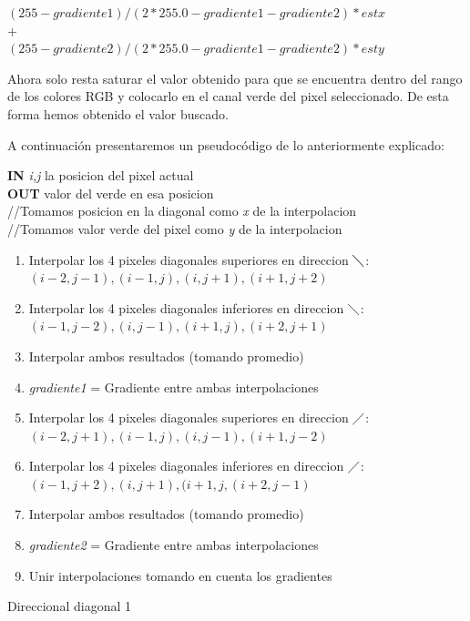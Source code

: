 \documentclass[10pt, a4paper]{article}
\begin{document}
\begin{center}
$(255-gradiente1)/(2*255.0-gradiente1-gradiente2)*estx$\\$+$\\$(255-gradiente2)/(2*255.0-gradiente1-gradiente2)*esty$
\end{center}

Ahora solo resta saturar el valor obtenido para que se encuentra dentro del rango de los colores RGB y colocarlo en el canal verde del pixel seleccionado. De esta forma hemos obtenido el valor buscado. 

A continuaci\'on presentaremos un pseudoc\'odigo de lo anteriormente explicado:

\vspace{0.5cm}
\begin{algorithm}[H]
\textbf{IN} \textit{i,j} la posicion del pixel actual \\
\textbf{OUT} valor del verde en esa posicion\\
//Tomamos posicion en la diagonal como \textit{x} de la interpolacion\\
//Tomamos valor verde del pixel como \textit{y} de la interpolacion\\
\begin{enumerate}[label=\bfseries Step \arabic*:]
\item Interpolar los 4 pixeles diagonales superiores en direccion $\diagdown$: $(i-2,j-1),(i-1,j),(i,j+1),(i+1,j+2)$\\
\item Interpolar los 4 pixeles diagonales inferiores en direccion $\diagdown$: $(i-1, j-2),(i, j-1),(i+1, j),(i+2, j+1)$\\
\item Interpolar ambos resultados (tomando promedio)\\
\item \textit{gradiente1} = Gradiente entre ambas interpolaciones\\
\item Interpolar los 4 pixeles diagonales superiores en direccion $\diagup$: $(i-2, j+1),(i-1, j), (i, j-1), (i+1, j-2)$
\item Interpolar los 4 pixeles diagonales inferiores en direccion $\diagup$: $(i-1, j+2),(i, j+1), (i+1, j, (i+2, j-1)$
\item Interpolar ambos resultados (tomando promedio)\\
\item \textit{gradiente2} = Gradiente entre ambas interpolaciones\\
\item Unir interpolaciones tomando en cuenta los gradientes\\
\end{enumerate}
\caption{Direccional diagonal 1}
\end{algorithm}
\vspace{0.5cm}
\end{document}
